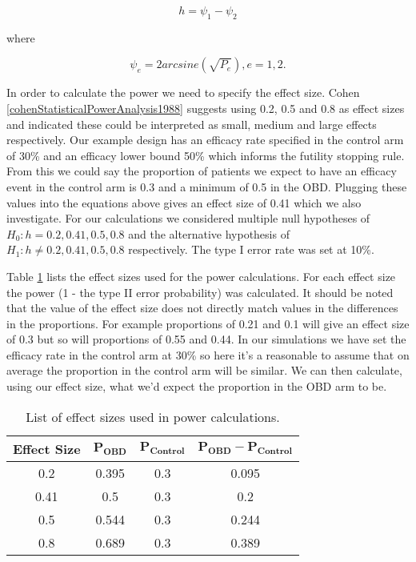 \begin{equation}
	h = \psi_1 - \psi_2
\end{equation}

where 

\begin{equation}
	\psi_e = 2arcsine(\sqrt{P_e}), e = 1,2.
\end{equation}

In order to calculate the power we need to specify the effect size.  Cohen \ref{cohenStatisticalPowerAnalysis1988} suggests using 0.2, 0.5 and 0.8 as effect sizes and indicated these could be interpreted as small, medium and large effects respectively. Our example design has an efficacy rate specified in the control arm of 30\% and an efficacy lower bound 50\% which informs the futility stopping rule. From this we could say the proportion of patients we expect to have an efficacy event in the control arm is 0.3 and a minimum of 0.5 in the OBD. Plugging these values into the equations above gives an effect size of 0.41 which we also investigate.  For our calculations we considered multiple null hypotheses of $H_0: h = 0.2,0.41,0.5,0.8$ and the alternative hypothesis of $H_1: h \neq 0.2,0.41,0.5,0.8$ respectively. The type \RN{1} error rate was set at 10\%.

Table \ref{tab_wt:EffectSizes} lists the effect sizes used for the power calculations. For each effect size the power (1 - the type \RN{2} error probability) was calculated. It should be noted that the value of the effect size does not directly match values in the differences in the proportions. For example proportions of 0.21 and 0.1 will give an effect size of 0.3 but so will proportions of 0.55 and 0.44. In our simulations we have set the efficacy rate in the control arm at 30\% so here it's a reasonable to assume that on average the proportion in the control arm will be similar. We can then calculate, using our effect size, what we'd expect the proportion in the OBD arm to be. 

\begin{table}[h!]
	\centering
	\caption{List of effect sizes used in power calculations. }
	\label{tab_wt:EffectSizes}
	\begin{tabular}{c|ccc}
		\hline
		\textbf{Effect Size} & $\mathbf{P_{OBD}}$ & $\mathbf{P_{Control}}$ & $\mathbf{P_{OBD} - P_{Control}}$ \\ \hline
		0.2                  & 0.395           & 0.3                 & 0.095          \\
		0.41                 & 0.5             & 0.3                 & 0.2            \\
		0.5                  & 0.544           & 0.3                 & 0.244          \\
		0.8                  & 0.689           & 0.3                 & 0.389          \\ \hline
	\end{tabular}
\end{table}

